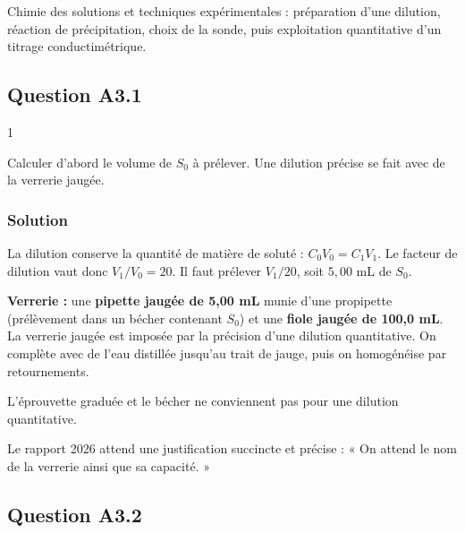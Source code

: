 \documentclass[11pt,a4paper]{article}
\begin{document}
Chimie des solutions et techniques expérimentales : préparation d'une dilution, réaction de précipitation, choix de la sonde, puis exploitation quantitative d'un titrage conductimétrique.

\hypertarget{question-a3.1}{%
\subsection{Question A3.1}\label{question-a3.1}}

\begin{indication}{1}

Calculer d'abord le volume de \(S_0\) à prélever. Une dilution précise se fait avec de la verrerie jaugée.

\end{indication}

\hypertarget{solution-16}{%
\subsubsection{Solution}\label{solution-16}}

La dilution conserve la quantité de matière de soluté : \(C_0 V_0 = C_1 V_1\). Le facteur de dilution vaut donc \(V_1/V_0 = 20\). Il faut prélever \(V_1/20\), soit \(5{,}00\) mL de \(S_0\).

\textbf{Verrerie :} une \textbf{pipette jaugée de 5,00 mL} munie d'une propipette (prélèvement dans un bécher contenant \(S_0\)) et une \textbf{fiole jaugée de 100,0 mL}. La verrerie jaugée est imposée par la précision d'une dilution quantitative. On complète avec de l'eau distillée jusqu'au trait de jauge, puis on homogénéise par retournements.

\begin{piege}

L'éprouvette graduée et le bécher ne conviennent pas pour une dilution quantitative.

\end{piege}

\begin{jury}

Le rapport 2026 attend une justification succincte et précise : « On attend le nom de la verrerie ainsi que sa capacité. »

\end{jury}

\hypertarget{question-a3.2}{%
\subsection{Question A3.2}\label{question-a3.2}}
\end{document}
